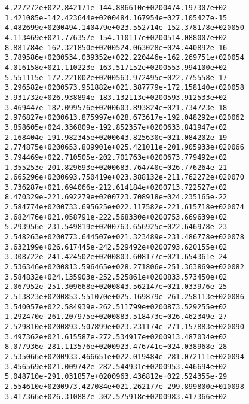 \documentclass[letterpaper,10pt,english]{/usr/share/sphinx/texinputs/sphinxhowto}
\newenvironment{InvisibleVerbatim}
        {\begin{mdframed}[leftmargin=0.1\linewidth,innerleftmargin=3pt,innerrightmargin=3pt, userdefinedwidth=1\linewidth, linewidth=0pt, linecolor=white, usetwoside=false]}
        {\end{mdframed}}
\begin{document}
\begin{InvisibleVerbatim}
\begin{alltt}
4.227272e+02   2.842171e-14   4.886610e+02  0047   4.197307e+02
1.421085e-14   2.423644e+02  0048   4.167954e+02   7.105427e-15
4.482699e+02  0049   4.140479e+02   3.552714e-15   2.378178e+02  0050
4.113469e+02   1.776357e-15   4.110117e+02  0051   4.088007e+02
8.881784e-16   2.321850e+02  0052   4.063028e+02   4.440892e-16
3.789586e+02  0053   4.039352e+02   2.220446e-16   2.269751e+02  0054
4.016158e+02   1.110223e-16   3.517152e+02  0055   3.994100e+02
5.551115e-17   2.221002e+02  0056   3.972495e+02   2.775558e-17
3.296582e+02  0057   3.951882e+02   1.387779e-17   2.158140e+02  0058
3.931732e+02   6.938894e-18   3.132113e+02  0059   3.912533e+02
3.469447e-18   2.099576e+02  0060   3.893824e+02   1.734723e-18
2.976827e+02  0061   3.875997e+02   8.673617e-19   2.048292e+02  0062
3.858605e+02   4.336809e-19   2.852357e+02  0063   3.841947e+02
2.168404e-19   1.982345e+02  0064   3.825630e+02   1.084202e-19
2.774875e+02  0065   3.809901e+02   5.421011e-20   1.905933e+02  0066
3.794469e+02   2.710505e-20   2.701763e+02  0067   3.779492e+02
1.355253e-20   1.829693e+02  0068   3.764740e+02   6.776264e-21
2.665296e+02  0069   3.750419e+02   3.388132e-21   1.762272e+02  0070
3.736287e+02   1.694066e-21   2.614184e+02  0071   3.722527e+02
8.470329e-22   1.692279e+02  0072   3.708918e+02   4.235165e-22
2.584774e+02  0073   3.695625e+02   2.117582e-22   1.615718e+02  0074
3.682476e+02   1.058791e-22   2.568330e+02  0075   3.669639e+02
5.293956e-23   1.549819e+02  0076   3.656925e+02   2.646978e-23
2.548263e+02  0077   3.644507e+02   1.323489e-23   1.486778e+02  0078
3.632199e+02   6.617445e-24   2.529492e+02  0079   3.620155e+02
3.308722e-24   1.424502e+02  0080   3.608177e+02   1.654361e-24
2.536346e+02  0081   3.596465e+02   8.271806e-25   1.363869e+02  0082
3.584832e+02   4.135903e-25   2.525861e+02  0083   3.573450e+02
2.067952e-25   1.309668e+02  0084   3.562147e+02   1.033976e-25
2.513823e+02  0085   3.551070e+02   5.169879e-26   1.258113e+02  0086
3.540057e+02   2.584939e-26   2.511799e+02  0087   3.529255e+02
1.292470e-26   1.207975e+02  0088   3.518473e+02   6.462349e-27
2.529810e+02  0089   3.507899e+02   3.231174e-27   1.157883e+02  0090
3.497362e+02   1.615587e-27   2.534917e+02  0091   3.487034e+02
8.077936e-28   1.113576e+02  0092   3.476741e+02   4.038968e-28
2.535066e+02  0093   3.466651e+02   2.019484e-28   1.072111e+02  0094
3.456569e+02   1.009742e-28   2.544931e+02  0095   3.446694e+02
5.048710e-29   1.031857e+02  0096   3.436812e+02   2.524355e-29
2.554610e+02  0097   3.427084e+02   1.262177e-29   9.899800e+01  0098
3.417366e+02   6.310887e-30   2.575918e+02  0098   3.417366e+02

\end{alltt}
\end{InvisibleVerbatim}
\end{document}
